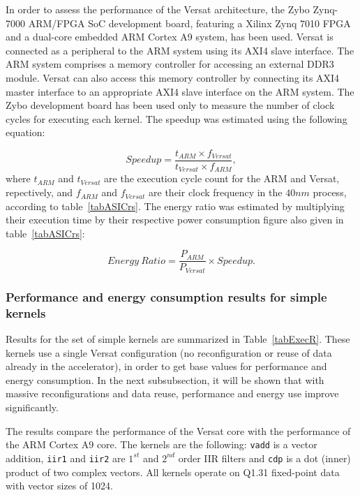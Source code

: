 \documentclass[journal]{IEEEtran}
\begin{document}
In order to assess the performance of the Versat architecture, the
Zybo Zynq-7000 ARM/FPGA SoC development board, featuring a Xilinx Zynq
7010 FPGA and a dual-core embedded ARM Cortex A9 system, has been
used. Versat is connected as a peripheral to the ARM system using its
AXI4 slave interface. The ARM system comprises a memory controller for
accessing an external DDR3 module. Versat can also access this memory
controller by connecting its AXI4 master interface to an appropriate
AXI4 slave interface on the ARM system. The Zybo development board has
been used only to measure the number of clock cycles for executing
each kernel. The speedup was estimated using the following equation:

\begin{equation}
Speedup = \frac{t_{ARM}\times f_{Versat}}{t_{Versat}\times f_{ARM}},
\label{eq:speedup}
\end{equation}
where $t_{ARM}$ and $t_{Versat}$ are the execution cycle count for the
ARM and Versat, repectively, and $f_{ARM}$ and $f_{Versat}$ are their
clock frequency in the $40nm$ process, according to
table~\ref{tabASICrs}. The energy ratio was estimated by multiplying
their execution time by their respective power consumption figure also
given in table~\ref{tabASICrs}:

\begin{equation}
Energy~Ratio = \frac{P_{ARM}}{P_{Versat}} \times Speedup.
\label{eq:energyRatio}
\end{equation}

\subsubsection{Performance and energy consumption results for simple kernels}
\label{subsection:ResultsSimpleKernels}

Results for the set of simple kernels are summarized in
Table~\ref{tabExecR}. These kernels use a single Versat configuration
(no reconfiguration or reuse of data already in the accelerator), in
order to get base values for performance and energy consumption. In
the next subsubsection, it will be shown that with massive reconfigurations
and data reuse, performance and energy use improve significantly.

The results compare the performance of the Versat core with the
performance of the ARM Cortex A9 core. The kernels are the following:
{\tt vadd} is a vector addition, {\tt iir1} and {\tt iir2} are $1^{st}$
and $2^{nd}$ order IIR filters and {\tt cdp} is a dot (inner) product of
two complex vectors. All kernels operate on Q1.31 fixed-point data
with vector sizes of 1024.
\end{document}
